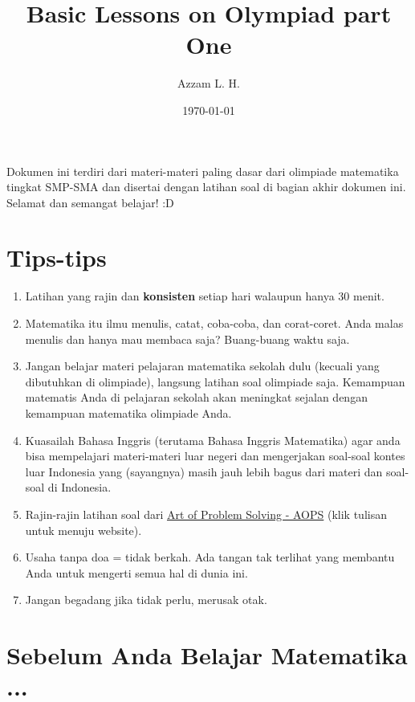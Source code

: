 \documentclass[11pt]{scrartcl}
\begin{document}
	\title{Basic Lessons on Olympiad part One} %
	\date{\today}
	\author{Azzam L. H.}
	\maketitle
    Dokumen ini terdiri dari materi-materi paling dasar dari olimpiade matematika tingkat SMP-SMA dan disertai dengan latihan soal di bagian akhir dokumen ini. Selamat dan semangat belajar! :D
	\section{Tips-tips}
	\begin{enumerate}
	    \item Latihan yang rajin dan \textbf{konsisten} setiap hari walaupun hanya 30 menit.
	    \item Matematika itu ilmu menulis, catat, coba-coba, dan corat-coret. Anda malas menulis dan hanya mau membaca saja? Buang-buang waktu saja.
	    \item Jangan belajar materi pelajaran matematika sekolah dulu (kecuali yang dibutuhkan di olimpiade), langsung latihan soal olimpiade saja. Kemampuan matematis Anda di pelajaran sekolah akan meningkat sejalan dengan kemampuan matematika olimpiade Anda.
	    \item Kuasailah Bahasa Inggris (terutama Bahasa Inggris Matematika) agar anda bisa mempelajari materi-materi luar negeri dan mengerjakan soal-soal kontes luar Indonesia yang (sayangnya) masih jauh lebih bagus dari materi dan soal-soal di Indonesia.
	    \item Rajin-rajin latihan soal dari \href{https://artofproblemsolving.com/community}{Art of Problem Solving - AOPS} (klik tulisan untuk menuju website).
	    \item Usaha tanpa doa = tidak berkah. Ada tangan tak terlihat yang membantu Anda untuk mengerti semua hal di dunia ini.
	    \item Jangan begadang jika tidak perlu, merusak otak.

	\end{enumerate}
	
	\section{Sebelum Anda Belajar Matematika ...}
\end{document}
